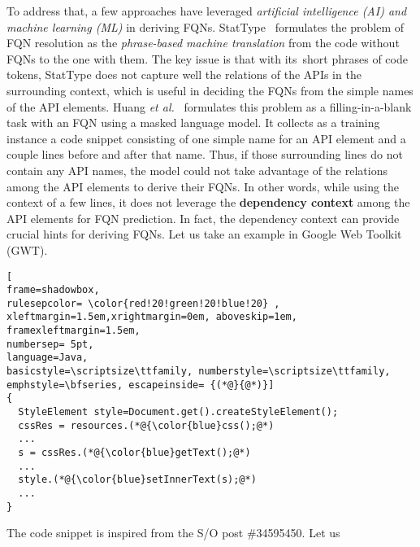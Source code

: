 To address that, a few approaches have leveraged {\em artificial
  intelligence (AI) and machine learning (ML)} in deriving
FQNs. StatType~\cite{icse18} formulates the problem of FQN resolution
as the {\em phrase-based machine translation} from the code without
FQNs to the one with them. The key issue is that with
its~short phrases of code tokens, StatType does not capture well the
relations of the APIs in the surrounding context, which is useful
in deciding the FQNs from the simple names of the API elements.
%
Huang {\em et al.}~\cite{prompt-ase22} formulates this problem as a
filling-in-a-blank task with an FQN using a masked language model.
It collects as a training instance a code snippet consisting
of one simple name for an API element and a couple lines before and
after that name. Thus, if those surrounding lines do not contain any
API names, the model could not take advantage of the relations among
the API elements to derive their FQNs. In other words, while using the
context of a few lines, it does not leverage the {\bf dependency
  context} among the API elements for FQN prediction. In fact, the
dependency context can provide crucial hints for deriving FQNs. Let us
take an example in Google Web Toolkit (GWT). 
\begin{lstlisting}[
frame=shadowbox,
rulesepcolor= \color{red!20!green!20!blue!20} ,
xleftmargin=1.5em,xrightmargin=0em, aboveskip=1em,
framexleftmargin=1.5em,
numbersep= 5pt,
language=Java,
basicstyle=\scriptsize\ttfamily, numberstyle=\scriptsize\ttfamily, emphstyle=\bfseries, escapeinside= {(*@}{@*)}]
{
  StyleElement style=Document.get().createStyleElement();
  cssRes = resources.(*@{\color{blue}css();@*)
  ...
  s = cssRes.(*@{\color{blue}getText();@*)
  ...
  style.(*@{\color{blue}setInnerText(s);@*)
  ...
}                
\end{lstlisting}
The code snippet is inspired from the S/O post \#34595450.  Let us
